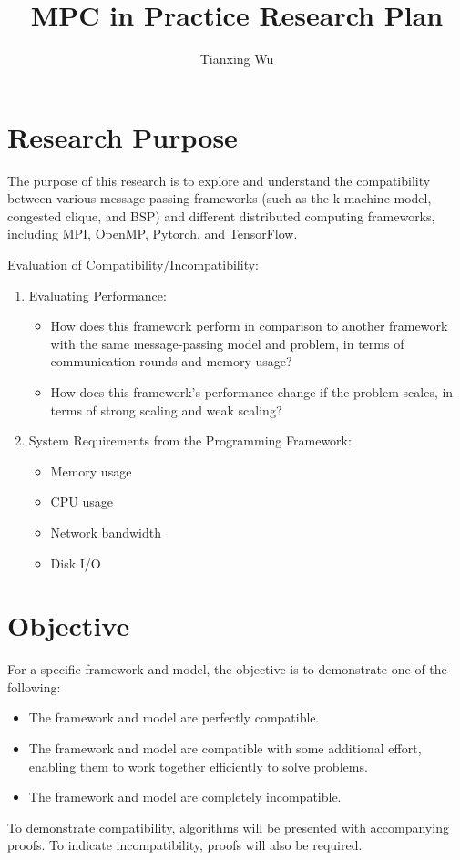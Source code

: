 \documentclass{article}
\title{MPC in Practice Research Plan}
\author{Tianxing Wu}
\begin{document}
\maketitle

\section{Research Purpose}
The purpose of this research is to explore and understand the compatibility between various message-passing frameworks (such as the k-machine model, congested clique, and BSP) and different distributed computing frameworks, including MPI, OpenMP, Pytorch, and TensorFlow.

Evaluation of Compatibility/Incompatibility:
\begin{enumerate}
  \item{
    Evaluating Performance:
      \begin{itemize}
        \item How does this framework perform in comparison to another framework with the same message-passing model and problem, in terms of communication rounds and memory usage?
        \item How does this framework's performance change if the problem scales, in terms of strong scaling and weak scaling?
      \end{itemize}
    }
  \item {
    System Requirements from the Programming Framework:
      \begin{itemize}
        \item Memory usage
        \item CPU usage
        \item Network bandwidth
        \item Disk I/O
      \end{itemize}
    }
\end{enumerate}

\section{Objective}
For a specific framework and model, the objective is to demonstrate one of the following:
\begin{itemize}
  \item The framework and model are perfectly compatible.
  \item The framework and model are compatible with some additional effort, enabling them to work together efficiently to solve problems.
  \item The framework and model are completely incompatible.
\end{itemize}
To demonstrate compatibility, algorithms will be presented with accompanying proofs. To indicate incompatibility, proofs will also be required.
\end{document}
